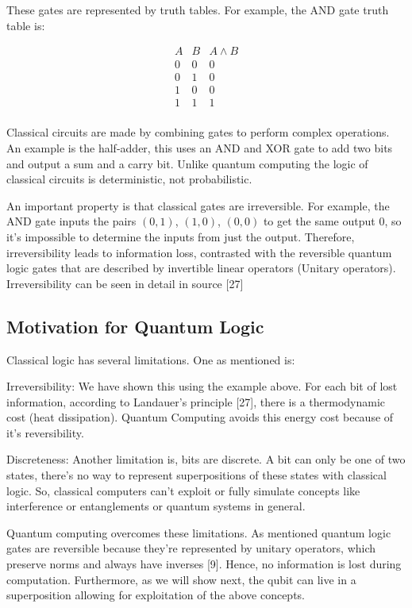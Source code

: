 \noindent These gates are represented by truth tables. For example, the AND gate truth table is:

\[
\begin{array}{c|c|c}
A & B & A \land B \\
\hline
0 & 0 & 0 \\
0 & 1 & 0 \\
1 & 0 & 0 \\
1 & 1 & 1 \\
\end{array}
\]

\noindent Classical circuits are made by combining gates to perform complex operations. An example is the half-adder, this uses an AND and XOR gate to add two bits and output a sum and a carry bit. Unlike quantum computing the logic of classical circuits is  deterministic, not probabilistic.

\noindent An important property is that classical gates are irreversible. For example, the AND gate inputs the pairs $(0,1)$, $(1,0)$, $(0,0)$ to get the same output $0$, so it's impossible to determine the inputs from just the output. Therefore, irreversibility leads to information loss, contrasted with the reversible quantum logic gates that are described by invertible linear operators (Unitary operators). Irreversibility can be seen in detail in source [27]


\subsection{Motivation for Quantum Logic}

Classical logic has several limitations. One as mentioned is:

\noindent Irreversibility: We have shown this using the example above. For each bit of lost information, according to Landauer’s principle [27], there is a thermodynamic cost (heat dissipation). Quantum Computing avoids this energy cost because of it's reversibility. 

\noindent Discreteness: Another limitation is, bits are discrete. A bit can only be one of two states, there's no way to represent superpositions of these states with classical logic. So, classical computers can't exploit or fully simulate concepts like interference or entanglements or quantum systems in general.

\noindent Quantum computing overcomes these limitations. As mentioned quantum logic gates are reversible because they're represented by unitary operators, which preserve norms and always have inverses [9]. Hence, no information is lost during computation. Furthermore, as we will show next, the qubit can live in a superposition allowing for exploitation of the above concepts.




